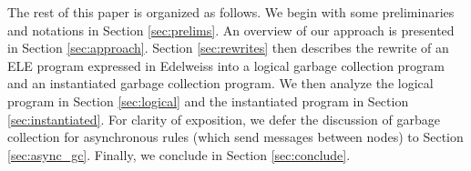 The rest of this paper is organized as follows.
We begin with some preliminaries and notations in Section \ref{sec:prelims}.
An overview of our approach is presented in Section \ref{sec:approach}.
Section \ref{sec:rewrites} then describes the rewrite of an ELE program expressed in Edelweiss into a logical garbage collection program and an instantiated garbage collection program.
We then analyze the logical program in Section \ref{sec:logical} and the instantiated program in Section \ref{sec:instantiated}.
For clarity of exposition, we defer the discussion of garbage collection for asynchronous rules (which send messages between nodes) to Section \ref{sec:async_gc}.
Finally, we conclude in Section \ref{sec:conclude}.

